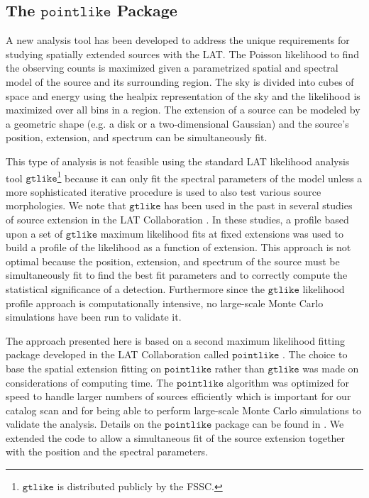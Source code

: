 \documentclass[12pt,preprint]{aastex}
\newcommand{\gtlike}{\ensuremath{\mathtt{gtlike}}\xspace}
\newcommand{\pointlike}{\ensuremath{\mathtt{pointlike}}\xspace}
\begin{document}
\subsection{The \pointlike Package}

A new analysis tool has been developed to address the unique requirements
for studying spatially extended sources with the LAT.
The Poisson likelihood to find
the observing counts is maximized given a parametrized spatial and
spectral model of the source and its surrounding region.  The sky is
divided into cubes of space and energy using the healpix representation
of the sky \citep{healpix} and the likelihood is maximized over all bins
in a region.  The extension of a source can be modeled by a geometric
shape (e.g. a disk or a two-dimensional Gaussian) and the source's position, extension,
and spectrum can be simultaneously fit.

This type of analysis is not feasible using the standard LAT likelihood
analysis tool \gtlike\footnote{\gtlike is distributed publicly by the
FSSC.} because it can only fit the spectral parameters of the model
unless a more sophisticated iterative procedure is used to also test
various source morphologies.  We note that \gtlike has been used in the
past in several studies of source extension in the LAT Collaboration
\citep{lmc,smc,w28,w51c}.  In these studies, a profile based upon a
set of \gtlike maximum likelihood fits at fixed extensions was used
to build a profile of the likelihood as a function of extension.
This approach is not optimal because the position, extension, and
spectrum of the source must be simultaneously fit to find the best fit
parameters and to correctly compute the statistical significance of
a detection.  Furthermore since the \gtlike likelihood profile approach
is computationally intensive, no large-scale Monte Carlo simulations
have been run to validate it.

The approach presented here is based on a second maximum likelihood
fitting package developed in the LAT Collaboration called \pointlike
\citep{first_cat,matthew_kerr_thesis}.  The choice to base the
spatial extension fitting on \pointlike rather than \gtlike was made
on considerations of computing time.  The \pointlike algorithm was
optimized for speed to handle larger numbers of sources efficiently
which is important for our catalog scan and for being able
to perform large-scale Monte Carlo simulations to validate the analysis.
Details on the \pointlike package can be
found in \cite{matthew_kerr_thesis}.  We extended the code to allow a
simultaneous fit of the source extension together with the position and
the spectral parameters.
\end{document}
